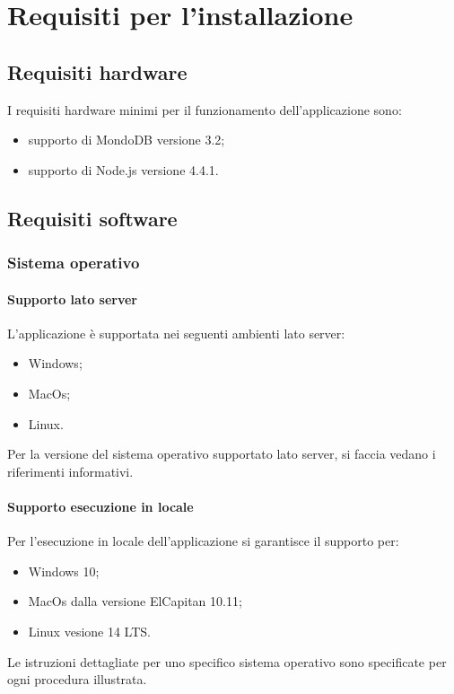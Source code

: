 \documentclass[12pt,a4paper]{article}
\begin{document}
	\newpage
	\section{Requisiti per l'installazione}\label{requisiti}
	\subsection{Requisiti hardware}\label{requisitiHW}
	I requisiti hardware minimi per il funzionamento dell'applicazione sono:
	\begin{itemize}
		\item supporto di MondoDB versione 3.2;
		\item supporto di Node.js versione 4.4.1.
	\end{itemize}
	\subsection{Requisiti software}\label{requisitiSW}
	\subsubsection{Sistema operativo}
	\paragraph{Supporto lato server}L'applicazione \prj{} è supportata nei seguenti ambienti lato server:
	\begin{itemize}
		\item Windows;
		\item MacOs;
		\item Linux.
	\end{itemize}
	Per la versione del sistema operativo supportato lato server, si faccia vedano i  riferimenti informativi.

	\paragraph{Supporto esecuzione in locale}
	Per l'esecuzione in locale  dell'applicazione si garantisce il supporto per:
		\begin{itemize}
			\item Windows 10;
			\item MacOs dalla versione ElCapitan 10.11;
			\item Linux vesione 14 LTS.
		\end{itemize}
	
	
	Le istruzioni dettagliate per uno specifico sistema operativo sono specificate per ogni procedura illustrata.
	
\end{document}
